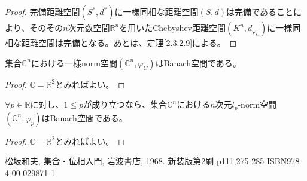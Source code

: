 \documentclass[dvipdfmx]{jsarticle}
\begin{document}
\begin{proof}
完備距離空間$\left( S^{*},d^{*} \right)$に一様同相な距離空間$(S,d)$は完備であることにより、そのその$n$次元数空間$\mathbb{R}^{n}$を用いたChebyshev距離空間$\left( K^{n},d_{\varphi_{C}} \right)$に一様同相な距離空間は完備となる。あとは、定理\ref{2.3.2.9}による。
\end{proof}
\begin{thm}\label{2.3.2.13}
集合$\mathbb{C}^{n}$における一様norm空間$\left( \mathbb{C}^{n},\varphi_{C} \right)$はBanach空間である。
\end{thm}
\begin{proof}
$\mathbb{C} = \mathbb{R}^{2}$とみればよい。
\end{proof}
\begin{thm}\label{2.3.2.14}
$\forall p \in \mathbb{R}$に対し、$1 \leq p$が成り立つなら、集合$\mathbb{C}^{n}$における$n$次元$l_{p}$-norm空間$\left( \mathbb{C}^{n},\varphi_{p} \right)$はBanach空間である。
\end{thm}
\begin{proof}
$\mathbb{C} = \mathbb{R}^{2}$とみればよい。
\end{proof}
\begin{thebibliography}{50}
  松坂和夫, 集合・位相入門, 岩波書店, 1968. 新装版第2刷 p111,275-285 ISBN978-4-00-029871-1
\end{thebibliography}
\end{document}
